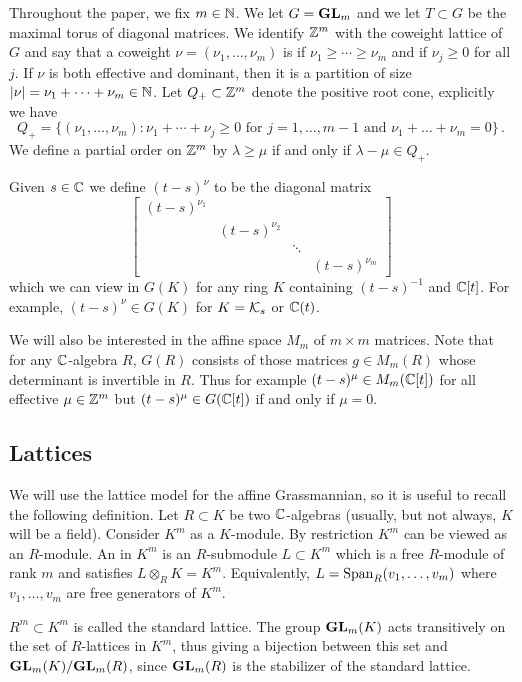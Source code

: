 \documentclass{article}
\begin{document}
Throughout the paper, we fix $ m \in \mathbb N$.  We let $G = {\mathbf{GL}}_m$ and we let $T\subset G$ be the maximal torus of diagonal matrices. 
We identify $\mathbb Z^m$ with the coweight lattice of $G$ and say that a coweight $\nu = (\nu_1,\dots,\nu_m)$ is  if $\nu_1\ge\cdots\ge\nu_m$ and  if $\nu_j\ge 0$ for all $j$.
% 
If $\nu$ is both effective and dominant, then it is a partition of size $|\nu| = \nu_1 + \cdots + \nu_m\in\mathbb N$.  Let $ Q_+ \subset \mathbb Z^m$ denote the positive root cone, explicitly we have
$$
    Q_+ = \{ (\nu_1, \dots, \nu_m) : \nu_1 + \cdots + \nu_j \ge 0 \text{ for $j = 1, \dots, m-1 $ and } \nu_1 + \dots + \nu_m = 0 \}\,. 
$$
We define a partial order on $ \mathbb Z^m$ by $ \lambda \ge \mu $ if and only if $ \lambda - \mu \in Q_+ $.

Given $s\in\mathbb C$ we define $(t-s)^\nu$ to be the diagonal matrix 
\[
\begin{bmatrix}
    (t-s)^{\nu_1} \\
    & (t-s)^{\nu_2} \\ 
    & & \ddots \\
    & & & (t-s)^{\nu_m}
\end{bmatrix} 
\]
which we can view in $G(K)$ for any ring $ K $ containing $(t-s)^{-1}$ and $\mathbb C[t]$. For example, $(t-s)^\nu\in G(K)$ for $ K = \mathcal K_s$ or $\mathbb C(t)$.

We will also be interested in the affine space $ M_m$ of $m\times m$ matrices.  Note that for any $ \mathbb C$-algebra $ R $, $G(R)$ consists of those matrices $ g \in M_m(R) $ whose determinant is invertible in $ R$. Thus for example $ (t-s)^\mu\in M_m(\mathbb C[t])$ for all effective $ \mu \in \mathbb Z^m$ but $(t-s)^\mu\in G(\mathbb C[t])$ if and only if $ \mu = 0 $.
% 

\subsection{Lattices}
\label{ss:lat}
% 
We will use the lattice model for the affine Grassmannian, so it is useful to recall the following definition. Let $ R \subset K$ be two $\mathbb C$-algebras (usually, but not always, $K$ will be a field). 
Consider $ K^m $ as a $K$-module. By restriction $ K^m$ can be viewed as an $R$-module.  An  in $K^m$ is an $R$-submodule $ L \subset K^m$ which is a free $R$-module of rank $ m $ and satisfies $ L \otimes_R K = K^m $. Equivalently, $ L = \operatorname{Span}_R(v_1, \dots, v_m)$ where $v_1, \dots, v_m$ are free generators of $K^m$. 
% 

$ R^m \subset K^m $ is called the standard lattice. The group ${\mathbf{GL}}_m(K) $ acts transitively on the set of $R$-lattices in $K^m$, thus giving a bijection between this set and ${\mathbf{GL}}_m(K)/{\mathbf{GL}}_m(R)$, since $ {\mathbf{GL}}_m(R) $ is the stabilizer of the standard lattice. 
\end{document}
